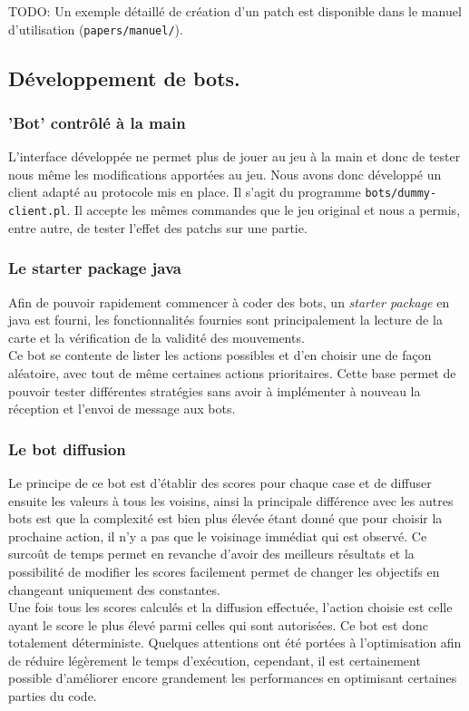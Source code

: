 \documentclass[a4paper,12pt]{article}
\begin{document}
TODO: Un exemple détaillé de création d'un patch est disponible dans le manuel
d'utilisation (\verb!papers/manuel/!).

\subsection{Développement de bots.}

\subsubsection{'Bot' contrôlé à la main}

L'interface développée ne permet plus de jouer au jeu à la main et donc de
tester nous même les modifications apportées au jeu. Nous avons donc développé
un client adapté au protocole mis en place. Il s'agit du programme
\verb!bots/dummy-client.pl!. Il accepte les mêmes commandes que le jeu original et
nous a permis, entre autre, de tester l'effet des patchs sur une partie.


\subsubsection{Le starter package java}
Afin de pouvoir rapidement commencer à coder des bots, un \emph{starter package}
en java est fourni, les fonctionnalités fournies sont principalement la lecture
de la carte et la vérification de la validité des mouvements.
\\
Ce bot se contente de lister les actions possibles et d'en choisir une de façon
aléatoire, avec tout de même certaines actions prioritaires. Cette base permet
de pouvoir tester différentes stratégies sans avoir à implémenter à nouveau la
réception et l'envoi de message aux bots.

\subsubsection{Le bot diffusion}
Le principe de ce bot est d'établir des scores pour chaque case et de diffuser
ensuite les valeurs à tous les voisins, ainsi la principale différence avec les
autres bots est que la complexité est bien plus élevée étant donné que pour
choisir la prochaine action, il n'y a pas que le voisinage immédiat qui est
observé. Ce surcoût de temps permet en revanche d'avoir des meilleurs résultats
et la possibilité de modifier les scores facilement permet de changer les
objectifs en changeant uniquement des constantes.
\\
Une fois tous les scores calculés et la diffusion effectuée, l'action choisie
est celle ayant le score le plus élevé parmi celles qui sont autorisées. Ce bot
est donc totalement déterministe. Quelques attentions ont été portées à
l'optimisation afin de réduire légèrement le temps d'exécution, cependant, il
est certainement possible d'améliorer encore grandement les performances en
optimisant certaines parties du code.
\end{document}
